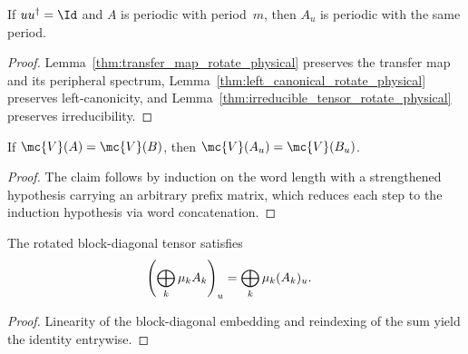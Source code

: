 \begin{lemma}%
    \label{thm:periodic_rotate_physical}
    \leanok
    If $uu^\dagger=\Id$ and $A$ is periodic with period~$m$, then
    $A_u$ is periodic with the same period.
\end{lemma}

\begin{proof}\leanok
    Lemma~\ref{thm:transfer_map_rotate_physical} preserves the transfer map
    and its peripheral spectrum, Lemma~\ref{thm:left_canonical_rotate_physical}
    preserves left-canonicity, and
    Lemma~\ref{thm:irreducible_tensor_rotate_physical} preserves
    irreducibility.
\end{proof}

\begin{lemma}%
    \label{thm:same_mpv_rotate_physical}
    \leanok
    If $\mc{V}(A)=\mc{V}(B)$, then $\mc{V}(A_u)=\mc{V}(B_u)$.
\end{lemma}

\begin{proof}\leanok
    The claim follows by induction on the word length with a strengthened
    hypothesis carrying an arbitrary prefix matrix, which reduces each step to
    the induction hypothesis via word concatenation.
\end{proof}

\begin{lemma}%
    \label{thm:rotate_physical_blocks}
    \leanok
    The rotated block-diagonal tensor satisfies
    \begin{align}
        \left(\bigoplus_k\mu_k A_k\right)_u
         & =\bigoplus_k\mu_k(A_k)_u.
        \notag
    \end{align}
\end{lemma}

\begin{proof}\leanok
    Linearity of the block-diagonal embedding and reindexing of the sum yield
    the identity entrywise.
\end{proof}

